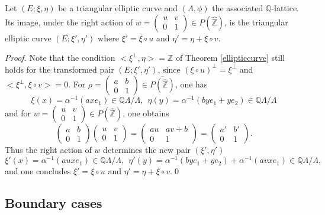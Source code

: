 \documentclass[graybox, envcountsect%
]{svmult}
\def\Q{{\mathbb Q}}
\def\Z{{\mathbb Z}}
\begin{document}
\begin{proposition}\label{rightactpz}
Let $(E;\xi,\eta)$ be a triangular elliptic curve and $(\Lambda,\phi)$ the associated $\Q$-lattice. Its image, under the right action of $w=\begin{pmatrix} u &v \\
0 &1 \end{pmatrix} \in  P(\hat \Z)$, is the triangular elliptic curve $(E;\xi',\eta')$ where $\xi'=\xi\circ u$ and $\eta'=\eta+\xi\circ v$.	
\end{proposition}
\begin{proof}  Note that the condition $<\xi^\perp,\eta>=\Z$ of Theorem \ref{ellipticcurve} still holds for the transformed pair $(E;\xi',\eta')$, 
since $(\xi\circ u)^\perp=\xi^\perp$ and $<\xi^\perp,\xi\circ v>=0$. 
For $\rho=\begin{pmatrix} a &b \\
0 &1 \end{pmatrix} \in  \overline{P(\hat \Z)}$, one has  
$$
\xi(x)=\alpha^{-1}(ax e_1)\in \Q\Lambda/\Lambda, \ \ 
\eta(y)=\alpha^{-1}(by e_1+y e_2)\in \Q\Lambda/\Lambda
$$
and for $w=\begin{pmatrix} u &v \\
0 &1 \end{pmatrix} \in  P(\hat \Z)$, one obtains
$$
\begin{pmatrix} a &b \\
0 &1 \end{pmatrix} \begin{pmatrix} u &v \\
0 &1 \end{pmatrix}=\begin{pmatrix} au &av +b\\
0 &1 \end{pmatrix}=
\begin{pmatrix} a' &b' \\
0 &1 \end{pmatrix}.
$$
 Thus the right action of $w$ determines the new pair $(\xi',\eta')$ 
 $$
\xi'(x)=\alpha^{-1}(aux e_1)\in \Q\Lambda/\Lambda, \ \ 
\eta'(y)=\alpha^{-1}(by e_1+y e_2)+\alpha^{-1}(avx e_1)\in \Q\Lambda/\Lambda,
$$
and one concludes $\xi'=\xi\circ u$ and $\eta'=\eta+\xi\circ v$.\qed	
\end{proof} 


\subsection{Boundary cases}\label{subsec:6.8}
\end{document}
